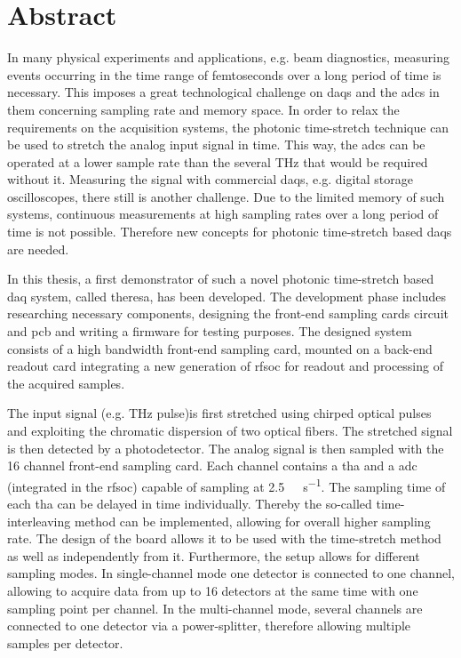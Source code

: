 \chapter*{Abstract}
In many physical experiments and applications, e.g. beam diagnostics, measuring events occurring in the time range of femtoseconds over a long period of time is necessary. 
This imposes a great technological challenge on \glspl{daq} and the \glspl{adc} in them concerning sampling rate and memory space.
In order to relax the requirements on the acquisition systems, the photonic time-stretch technique can be used to stretch the analog input signal in time.
This way, the \glspl{adc} can be operated at a lower sample rate than the several \si{\THz} that would be required without it. 
Measuring the signal with commercial \glspl{daq}, e.g. digital storage oscilloscopes, there still is another challenge.
Due to the limited memory of such systems, continuous measurements at high sampling rates over a long period of time is not possible.
Therefore new concepts for photonic time-stretch based \glspl{daq} are needed.

In this thesis, a first demonstrator of such a novel photonic time-stretch based \gls{daq} system, called \gls{theresa}, has been developed.
The development phase includes researching necessary components, designing the front-end sampling cards circuit and \gls{pcb} and writing a firmware for testing purposes.
The designed system consists of a high bandwidth front-end sampling card, mounted on a back-end readout card integrating a new generation of \gls{rfsoc} for readout and processing of the acquired samples.

The input signal (e.g. \si{\tera \hertz} pulse)is first stretched using chirped optical pulses and exploiting the chromatic dispersion of two optical fibers.
The stretched signal is then detected by a photodetector.
The analog signal is then sampled with the 16 channel front-end sampling card.
Each channel contains a \gls{tha} and a \gls{adc} (integrated in the \gls{rfsoc}) capable of sampling at \SI{2.5}{\giga \sample \per \second}.
The sampling time of each \gls{tha} can be delayed in time individually. 
Thereby the so-called time-interleaving method can be implemented, allowing for overall higher sampling rate.
The design of the board allows it to be used with the time-stretch method as well as independently from it.
Furthermore, the setup allows for different sampling modes.
In single-channel mode one detector is connected to one channel, allowing to acquire data from up to 16 detectors at the same time with one sampling point per channel.
In the multi-channel mode, several channels are connected to one detector via a power-splitter, therefore allowing multiple samples per detector.

